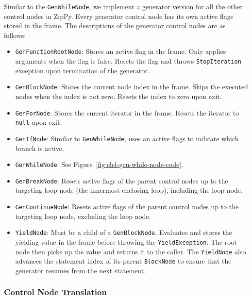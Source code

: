Similar to the \texttt{GenWhileNode}, we implement a generator version for all the other control nodes in ZipPy.
Every generator control node has its own active flags stored in the frame.
The descriptions of the generator control nodes are as follows:

\begin{itemize}

\item \texttt{GenFunctionRootNode}:
Stores an active flag in the frame.
Only applies arguments when the flag is false.
Resets the flag and throws \texttt{StopIteration} exception upon termination of the generator.

\item \texttt{GenBlockNode}:
Stores the current node index in the frame.
Skips the executed nodes when the index is not zero.
Resets the index to zero upon exit.

\item \texttt{GenForNode}:
Stores the current iterator in the frame.
Resets the iterator to \texttt{null} upon exit.

\item \texttt{GenIfNode}:
Similar to \texttt{GenWhileNode}, uses an active flags to indicate which branch is active.

\item \texttt{GenWhileNode}:
See Figure~\ref{fig:ch4-gen-while-node-code}.

\item \texttt{GenBreakNode}:
Resets active flags of the parent control nodes up to the targeting loop node (the innermost enclosing loop), including the loop node.

\item \texttt{GenContinueNode}:
Resets active flags of the parent control nodes up to the targeting loop node, excluding the loop node.

\item \texttt{YieldNode}:
Must be a child of a \texttt{GenBlockNode}.
Evaluates and stores the yielding value in the frame before throwing the \texttt{YieldException}.
The root node then picks up the value and returns it to the caller.
The \texttt{YieldNode} also advances the statement index of its parent \texttt{BlockNode} to ensure that the generator resumes from the next statement.

\end{itemize}

\subsubsection*{Control Node Translation}
\label{sec:ch4-ast-of-gen-func}

